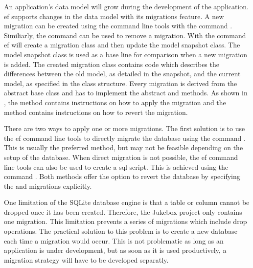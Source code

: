 
An application's data model will grow during the development of the application. \gls{ef} supports changes in the data model with its migrations feature. A new migration can be created using the command line tools with the command . Similiarly, the  command can be used to remove a migration. With the  command \gls{ef} will create a migration class and then update the model snapshot class. The model snapshot class is used as a base line for comparison when a new migration is added. The created migration class contains code which describes the differences between the old model, as detailed in the snapshot, and the current model, as specified in the class structure. Every migration is derived from the abstract base class  and has to implement the abstract  and  methods. As shown in , the  method contains instructions on how to apply the migration and the  method contains instructions on how to revert the migration. \cite{efMigrations}

There are two ways to apply one or more migrations. The first solution is to use the \gls{ef} command line tools to directly migrate the database using the command . This is usually the preferred method, but may not be feasible depending on the setup of the database. When direct migration is not possible, the \gls{ef} command line tools can also be used to create a \gls{sql} script. This is achieved using the command . Both methods offer the option to revert the database by specifying the  and  migrations explicitly.

One limitation of the SQLite database engine is that a table or column cannot be dropped once it has been created. Therefore, the Jukebox project only contains one migration. This limitation prevents a series of migrations which include drop operations. The practical solution to this problem is to create a new database each time a migration would occur. This is not problematic as long as an application is under development, but as soon as it is used productively, a migration strategy will have to be developed separatly.



